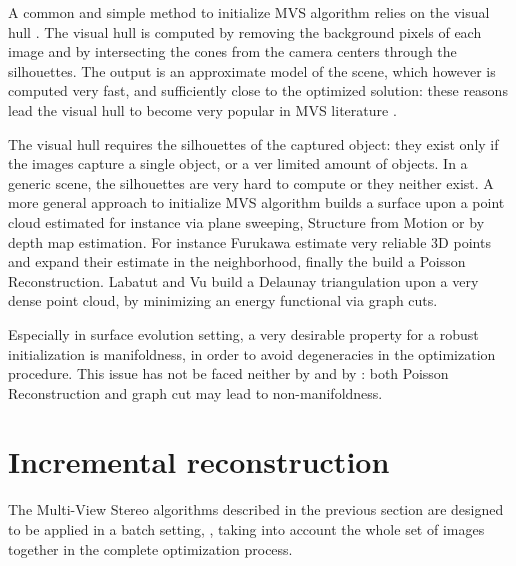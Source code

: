 A common and simple method to initialize MVS algorithm relies on the visual hull \cite{laurentini1994visual}. 
The visual hull is computed by removing the background pixels of each image and by intersecting the cones from the camera centers through the silhouettes. 
The output is an approximate model of the scene, which however is computed very fast, and sufficiently close to the optimized solution: these reasons lead the visual hull to become very popular in MVS literature \cite{jin2002variational,soatto2003tales,zaharescu2007transformesh,yoon2010joint}.

The visual hull requires the silhouettes of the captured object: they exist only if the images capture a single object, or a ver limited amount of objects.
In a generic scene, the silhouettes are very hard to compute or they neither exist.
A more general approach to initialize MVS algorithm builds a surface upon a point cloud estimated for instance via plane sweeping, Structure from Motion or by depth map estimation.
For instance Furukawa \etal \cite{fu10} estimate very reliable 3D points and expand their estimate in the neighborhood, finally the build a Poisson Reconstruction. 
Labatut \etal \cite{labatut2007efficient} and Vu \etal \cite{vu_et_al_2012} build a Delaunay triangulation upon a very dense point cloud, by minimizing an energy functional via graph cuts.

Especially in surface evolution setting, a very desirable property for a robust initialization is manifoldness, in order to avoid degeneracies in the optimization procedure. 
This issue has not be faced neither by \cite{fu10} and by \cite{labatut2007efficient,vu_et_al_2012}: both Poisson Reconstruction and graph cut may lead to non-manifoldness.



\section{Incremental reconstruction} 
The Multi-View Stereo algorithms described in the previous section are designed to be applied in a batch setting, \ie, taking into account the whole set of images together in the complete optimization process.

